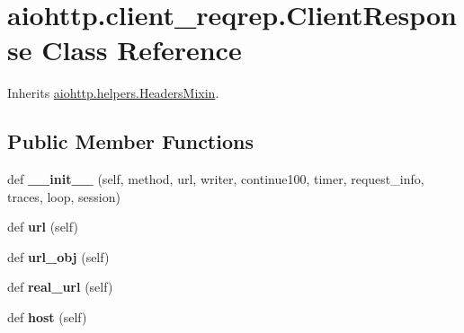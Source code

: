 \hypertarget{classaiohttp_1_1client__reqrep_1_1_client_response}{}\section{aiohttp.\+client\+\_\+reqrep.\+Client\+Response Class Reference}
\label{classaiohttp_1_1client__reqrep_1_1_client_response}


Inherits \hyperlink{classaiohttp_1_1helpers_1_1_headers_mixin}{aiohttp.\+helpers.\+Headers\+Mixin}.

\subsection*{Public Member Functions}
\begin{DoxyCompactItemize}
\item 
\mbox{\label{classaiohttp_1_1client__reqrep_1_1_client_response_ad6a5bb4f0ad0438919f2f84987db9a05}} 
def {\bfseries \+\_\+\+\_\+init\+\_\+\+\_\+} (self, method, url, writer, continue100, timer, request\+\_\+info, traces, loop, session)
\item 
\mbox{\label{classaiohttp_1_1client__reqrep_1_1_client_response_a74bbeff0e6ca57adf41ad8d24063cac4}} 
def {\bfseries url} (self)
\item 
\mbox{\label{classaiohttp_1_1client__reqrep_1_1_client_response_a99081fb838bc29c276fdbfe7eb06e0de}} 
def {\bfseries url\+\_\+obj} (self)
\item 
\mbox{\label{classaiohttp_1_1client__reqrep_1_1_client_response_a6abf859fc5df1560c199c1b2de7cf781}} 
def {\bfseries real\+\_\+url} (self)
\item 
\mbox{\label{classaiohttp_1_1client__reqrep_1_1_client_response_a2ff8f1a8dda8340c65f857bcab73cde7}} 
def {\bfseries host} (self)
\item 
\mbox{\label{classaiohttp_1_1client__reqrep_1_1_client_response_af366c0f78c75dbb9691ac99eb7cae2f6}} 

\end{DoxyCompactItemize}
